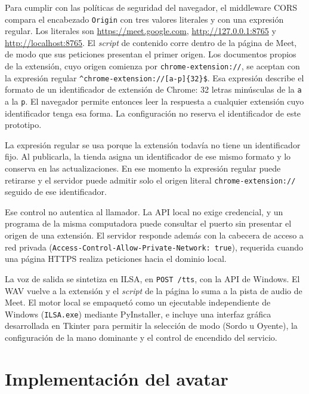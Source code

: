 Para cumplir con las políticas de seguridad del navegador, el middleware CORS compara el encabezado \texttt{Origin} con tres valores literales y con una expresión regular. Los literales son \url{https://meet.google.com}, \url{http://127.0.0.1:8765} y \url{http://localhost:8765}. El \textit{script} de contenido corre dentro de la página de Meet, de modo que sus peticiones presentan el primer origen. Los documentos propios de la extensión, cuyo origen comienza por \texttt{chrome-extension://}, se aceptan con la expresión regular \texttt{\textasciicircum chrome-extension://[a-p]\{32\}\$}. Esa expresión describe el formato de un identificador de extensión de Chrome: 32 letras minúsculas de la \texttt{a} a la \texttt{p}. El navegador permite entonces leer la respuesta a cualquier extensión cuyo identificador tenga esa forma. La configuración no reserva el identificador de este prototipo.

La expresión regular se usa porque la extensión todavía no tiene un identificador fijo. Al publicarla, la tienda asigna un identificador de ese mismo formato y lo conserva en las actualizaciones. En ese momento la expresión regular puede retirarse y el servidor puede admitir solo el origen literal \texttt{chrome-extension://} seguido de ese identificador.

Ese control no autentica al llamador. La API local no exige credencial, y un programa de la misma computadora puede consultar el puerto sin presentar el origen de una extensión. El servidor responde además con la cabecera de acceso a red privada (\texttt{Access-Control-Allow-Private-Network: true}), requerida cuando una página HTTPS realiza peticiones hacia el dominio local.

La voz de salida se sintetiza en ILSA, en \texttt{POST /tts}, con la API de Windows. El WAV vuelve a la extensión y el \textit{script} de la página lo suma a la pista de audio de Meet. El motor local se empaquetó como un ejecutable independiente de Windows (\texttt{ILSA.exe}) mediante PyInstaller, e incluye una interfaz gráfica desarrollada en Tkinter para permitir la selección de modo (Sordo u Oyente), la configuración de la mano dominante y el control de encendido del servicio.

\section{Implementación del avatar}

